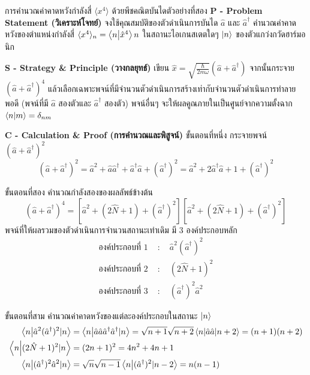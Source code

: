 \begin{psctbox}{การคำนวณค่าคาดหวังกำลังสี่ $\langle x^4 \rangle$ ด้วยพีชคณิตบันได}{ตัวอย่างที่สอง}
\noindent\textbf{P - Problem Statement (วิเคราะห์โจทย์)} จงใช้คุณสมบัติของตัวดำเนินการบันได $\hat{a}$ และ $\hat{a}^\dagger$ คำนวณค่าคาดหวังของตำแหน่งกำลังสี่ $\langle x^4 \rangle_n = \braket{n}{\hat{x}^4}{n}$ ในสถานะไอเกนสเตตใดๆ $\ket{n}$ ของตัวแกว่งกวัดฮาร์มอนิก

\vspace{6pt}
\noindent\textbf{S - Strategy \& Principle (วางกลยุทธ์)} เขียน $\hat{x} = \sqrt{\frac{\hbar}{2m\omega}}(\hat{a} + \hat{a}^\dagger)$ จากนั้นกระจาย $(\hat{a} + \hat{a}^\dagger)^4$ แล้วเลือกเฉพาะพจน์ที่มีจำนวนตัวดำเนินการสร้างเท่ากับจำนวนตัวดำเนินการทำลายพอดี (พจน์ที่มี $\hat{a}$ สองตัวและ $\hat{a}^\dagger$ สองตัว) พจน์อื่นๆ จะให้ผลคูณภายในเป็นศูนย์จากความตั้งฉาก $\braket{n}{m} = \delta_{nm}$

\vspace{6pt}
\noindent\textbf{C - Calculation \& Proof (การคำนวณและพิสูจน์)}
ขั้นตอนที่หนึ่ง กระจายพจน์ $(\hat{a} + \hat{a}^\dagger)^2$
\begin{equation}
(\hat{a} + \hat{a}^\dagger)^2 = \hat{a}^2 + \hat{a}\hat{a}^\dagger + \hat{a}^\dagger\hat{a} + (\hat{a}^\dagger)^2 = \hat{a}^2 + 2\hat{a}^\dagger\hat{a} + 1 + (\hat{a}^\dagger)^2
\end{equation}

ขั้นตอนที่สอง คำนวณกำลังสองของผลลัพธ์ข้างต้น
\begin{equation}
(\hat{a} + \hat{a}^\dagger)^4 = \left[ \hat{a}^2 + (2\hat{N} + 1) + (\hat{a}^\dagger)^2 \right]\left[ \hat{a}^2 + (2\hat{N} + 1) + (\hat{a}^\dagger)^2 \right]
\end{equation}
พจน์ที่ให้ผลรวมของตัวดำเนินการจำนวนสถานะเท่าเดิม มี 3 องค์ประกอบหลัก
\begin{align}
\text{องค์ประกอบที่ 1 } &\colon \quad \hat{a}^2 (\hat{a}^\dagger)^2 \\
\text{องค์ประกอบที่ 2 } &\colon \quad (2\hat{N} + 1)^2 \\
\text{องค์ประกอบที่ 3 } &\colon \quad (\hat{a}^\dagger)^2 \hat{a}^2
\end{align}

ขั้นตอนที่สาม คำนวณค่าคาดหวังของแต่ละองค์ประกอบในสถานะ $\ket{n}$
\begin{align}
\braket{n}{\hat{a}^2 (\hat{a}^\dagger)^2|n} &= \braket{n}{\hat{a}\hat{a}\hat{a}^\dagger\hat{a}^\dagger|n} = \sqrt{n+1}\sqrt{n+2}\braket{n}{\hat{a}\hat{a}|n+2} = (n+1)(n+2) \\
\braket{n}{(2\hat{N} + 1)^2|n} &= (2n + 1)^2 = 4n^2 + 4n + 1 \\
\braket{n}{(\hat{a}^\dagger)^2 \hat{a}^2|n} &= \sqrt{n}\sqrt{n-1}\braket{n}{(\hat{a}^\dagger)^2|n-2} = n(n - 1)
\end{align}


\end{psctbox}
